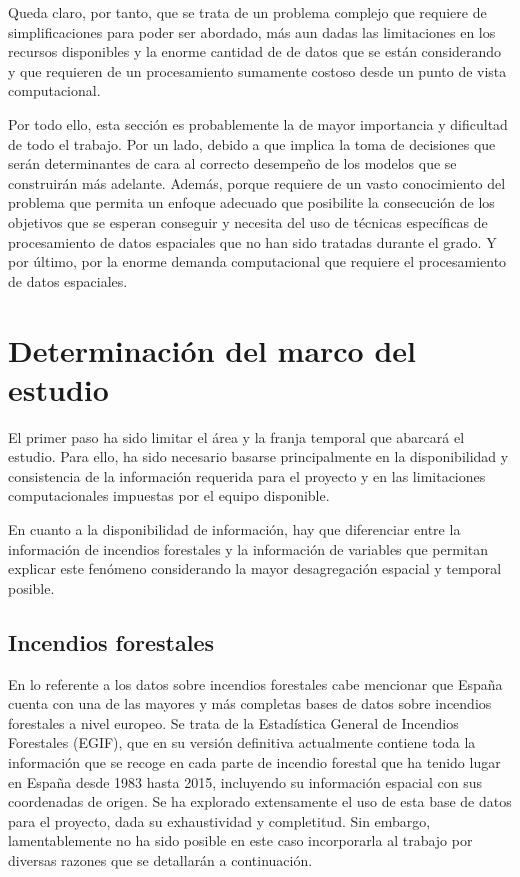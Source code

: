 \documentclass[12pt,a4paper,]{book}
\numberwithin{dummy}{section}
\theoremstyle{ocrenumbox}
\theoremstyle{blacknumex}
\theoremstyle{blacknumbox}
\theoremstyle{ocrenum}
\theoremstyle{ocrenum}
\begin{document}
Queda claro, por tanto, que se trata de un problema complejo que
requiere de simplificaciones para poder ser abordado, más aun dadas las
limitaciones en los recursos disponibles y la enorme cantidad de de
datos que se están considerando y que requieren de un procesamiento
sumamente costoso desde un punto de vista computacional.

Por todo ello, esta sección es probablemente la de mayor importancia y
dificultad de todo el trabajo. Por un lado, debido a que implica la toma
de decisiones que serán determinantes de cara al correcto desempeño de
los modelos que se construirán más adelante. Además, porque requiere de
un vasto conocimiento del problema que permita un enfoque adecuado que
posibilite la consecución de los objetivos que se esperan conseguir y
necesita del uso de técnicas específicas de procesamiento de datos
espaciales que no han sido tratadas durante el grado. Y por último, por
la enorme demanda computacional que requiere el procesamiento de datos
espaciales.

\hypertarget{determinaciuxf3n-del-marco-del-estudio}{%
\section{Determinación del marco del
estudio}\label{determinaciuxf3n-del-marco-del-estudio}}

El primer paso ha sido limitar el área y la franja temporal que abarcará
el estudio. Para ello, ha sido necesario basarse principalmente en la
disponibilidad y consistencia de la información requerida para el
proyecto y en las limitaciones computacionales impuestas por el equipo
disponible.

En cuanto a la disponibilidad de información, hay que diferenciar entre
la información de incendios forestales y la información de variables que
permitan explicar este fenómeno considerando la mayor desagregación
espacial y temporal posible.

\hypertarget{incendios-forestales}{%
\subsection{Incendios forestales}\label{incendios-forestales}}

En lo referente a los datos sobre incendios forestales cabe mencionar
que España cuenta con una de las mayores y más completas bases de datos
sobre incendios forestales a nivel europeo. Se trata de la Estadística
General de Incendios Forestales (EGIF), que en su versión definitiva
actualmente contiene toda la información que se recoge en cada parte de
incendio forestal que ha tenido lugar en España desde 1983 hasta 2015,
incluyendo su información espacial con sus coordenadas de origen. Se ha
explorado extensamente el uso de esta base de datos para el proyecto,
dada su exhaustividad y completitud. Sin embargo, lamentablemente no ha
sido posible en este caso incorporarla al trabajo por diversas razones
que se detallarán a continuación.
\end{document}

